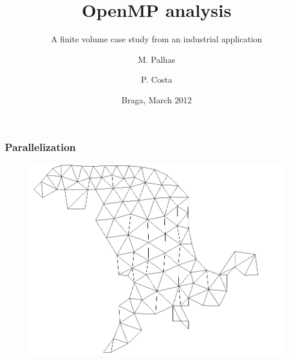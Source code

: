 \documentclass{beamer}
\title{OpenMP analysis}
\subtitle{A finite volume case study from an industrial application}
\author{M. Palhas \and P. Costa}
\institute[19808 \and 19830]{
	University of Minho\\
	Department of Informatics
}
\date{Braga, March 2012}
\begin{document}

\maketitle%


\begin{frame}
	\frametitle{Parallelization}
	\begin{figure}
		\begin{center}
			\includegraphics[height=0.8\textheight]{images/slides.march/mesh0.png}
		\end{center}
	\end{figure}
\end{frame}
\end{document}
